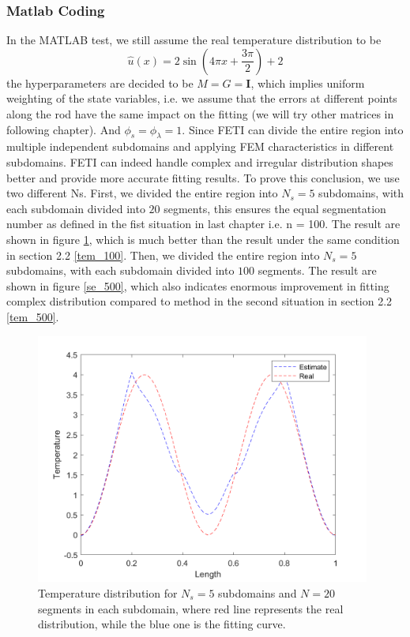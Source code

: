 \documentclass{article}
\begin{document}
\subsubsection{Matlab Coding}
 In the MATLAB test, we still assume the real temperature distribution to be     \begin{equation}
    \hat{u}(x)=2\sin(4\pi x+\frac{3\pi}{2})+2
    \end{equation}
    the hyperparameters are decided to be $M=G=\mathbf{I}$, which implies uniform weighting of the state variables, i.e. we assume that the errors at different points along the rod have the same impact on the fitting (we will try other matrices in following chapter). And $\phi_s=\phi_\lambda=1$.
   Since FETI can divide the entire region into multiple independent subdomains and applying FEM characteristics in different subdomains. FETI can indeed handle complex and irregular distribution shapes better and provide more accurate fitting results. To prove this conclusion, we use two different Ns. First, we divided the entire region into $N_s = 5$ subdomains, with each subdomain divided into $20$ segments, this ensures the equal segmentation number as defined in the fist situation in last chapter i.e. n = 100. The result are shown in figure \ref{se_100}, which is much better than the result under the same condition in section 2.2 \ref{tem_100}. Then, we divided the entire region into $N_s = 5$ subdomains, with each subdomain divided into $100$ segments. The result are shown in figure \ref{se_500}, which also indicates enormous improvement in fitting complex distribution compared to method in the second situation in section 2.2 \ref{tem_500}.
    \begin{figure}[H]
        \centering %
        \includegraphics[width=11cm]{pic/se3_n=100.png} %
        \caption{Temperature distribution for $N_s=5$ subdomains and $N=20$ segments in each subdomain, where red line represents the real distribution, while the blue one is the fitting curve.} %
        \label{se_100}
    \end{figure}     
\end{document}
